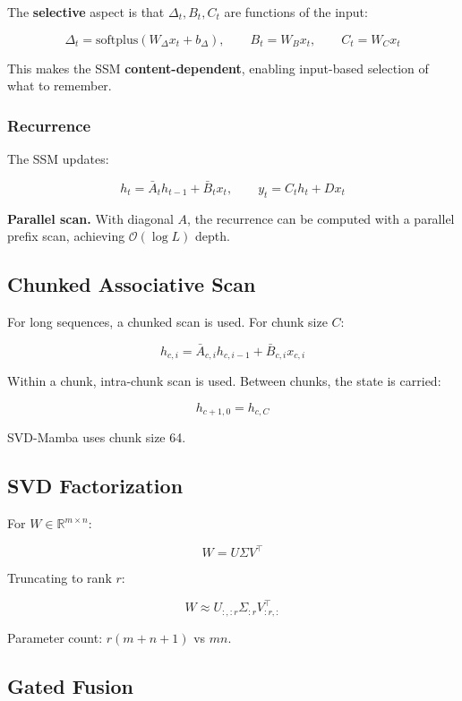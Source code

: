 The \textbf{selective} aspect is that $\Delta_t, B_t, C_t$ are functions of the 
input:

\[
\Delta_t = \text{softplus}(W_\Delta x_t + b_\Delta), \qquad
B_t = W_B x_t, \qquad
C_t = W_C x_t
\tag{3.7}
\]

This makes the SSM \textbf{content-dependent}, enabling input-based selection 
of what to remember.

\subsubsection{Recurrence}

The SSM updates:

\[
h_t = \bar{A}_t h_{t-1} + \bar{B}_t x_t, \qquad
y_t = C_t h_t + D x_t
\tag{3.8}
\]

\textbf{Parallel scan.} With diagonal $A$, the recurrence can be computed with 
a parallel prefix scan, achieving $\mathcal{O}(\log L)$ depth.

\subsection{Chunked Associative Scan}

For long sequences, a chunked scan is used. For chunk size $C$:

\[
h_{c, i} = \bar{A}_{c, i} h_{c, i-1} + \bar{B}_{c, i} x_{c, i}
\tag{3.9}
\]

Within a chunk, intra-chunk scan is used. Between chunks, the state is 
carried:

\[
h_{c+1, 0} = h_{c, C}
\tag{3.10}
\]

SVD-Mamba uses chunk size 64.

\subsection{SVD Factorization}

For $W \in \mathbb{R}^{m \times n}$:

\[
W = U \Sigma V^\top
\tag{3.11}
\]

Truncating to rank $r$:

\[
W \approx U_{:, :r} \Sigma_{:r} V_{:r, :}^\top
\tag{3.12}
\]

Parameter count: $r(m + n + 1)$ vs $mn$.

\subsection{Gated Fusion}

